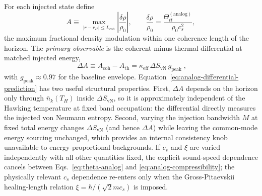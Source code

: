 \documentclass[aps,prd,twocolumn,superscriptaddress,nofootinbib,floatfix]{revtex4-2}
\begin{document}
For each injected state define
\begin{equation}
    A \equiv \max_{|r-r_H|\le L_{\mathrm{coh}}}\left|\frac{\delta\rho}{\rho_0}\right|,
    \qquad
    \frac{\delta \rho}{\rho_0} = \frac{\Theta_{tt}^{(\mathrm{analog})}}{\rho_0 c_s^2},
\end{equation}
the maximum fractional density modulation within one coherence length of the horizon. The \emph{primary observable} is the coherent-minus-thermal differential at matched injected energy,
\begin{equation}
    \boxed{\;\Delta A \equiv A_{\mathrm{coh}} - A_{\mathrm{th}}
    = \kappa_{\mathrm{eff}}\,\Delta S_{\mathrm{vN}}\,g_{\mathrm{peak}}\;,}
    \label{eq:analog-differential-prediction}
\end{equation}
with $g_{\mathrm{peak}} \approx 0.97$ for the baseline envelope. Equation~\eqref{eq:analog-differential-prediction} has two useful structural properties. First, $\Delta A$ depends on the horizon only through $\bar{n}_k(T_H)$ inside $\Delta S_{\mathrm{vN}}$, so it is approximately independent of the Hawking temperature at fixed band occupation: the differential directly measures the injected von Neumann entropy. Second, varying the injection bandwidth $M$ at fixed total energy changes $\Delta S_{\mathrm{vN}}$ (and hence $\Delta A$) while leaving the common-mode energy sourcing unchanged, which provides an internal consistency knob unavailable to energy-proportional backgrounds. If $c_s$ and $\xi$ are varied independently with all other quantities fixed, the explicit sound-speed dependence cancels between Eqs.~\eqref{eq:theta-analog} and \eqref{eq:analog-compressibility}; the physically relevant $c_s$ dependence re-enters only when the Gross-Pitaevskii healing-length relation $\xi=\hbar/(\sqrt{2}mc_s)$ is imposed.
\end{document}
